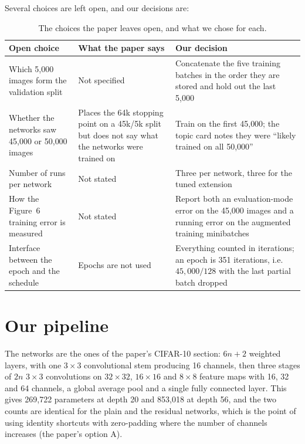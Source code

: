 \documentclass[11pt,a4paper]{article}
\begin{document}
Several choices are left open, and our decisions are:

\begin{table}[htbp]
\centering
\begin{tabular}{@{}p{3.6cm}p{5.2cm}p{6.4cm}@{}}
\toprule
\textbf{Open choice} & \textbf{What the paper says} & \textbf{Our decision} \\
\midrule
Which 5{,}000 images form the validation split & Not specified & Concatenate the five training batches in the order they are stored and hold out the last 5{,}000 \\
Whether the networks saw 45{,}000 or 50{,}000 images & Places the 64k stopping point on a 45k/5k split but does not say what the networks were trained on & Train on the first 45{,}000; the topic card notes they were ``likely trained on all 50{,}000'' \\
Number of runs per network & Not stated & Three per network, three for the tuned extension \\
How the Figure~6 training error is measured & Not stated & Report both an evaluation-mode error on the 45{,}000 images and a running error on the augmented training minibatches \\
Interface between the epoch and the schedule & Epochs are not used & Everything counted in iterations; an epoch is 351 iterations, i.e.\ $45{,}000/128$ with the last partial batch dropped \\
\bottomrule
\end{tabular}
\caption{The choices the paper leaves open, and what we chose for each.}
\label{tab:choices}
\end{table}

\section{Our pipeline}

The networks are the ones of the paper's CIFAR-10 section: $6n+2$ weighted
layers, with one $3\times3$ convolutional stem producing 16 channels, then three
stages of $2n$ $3\times3$ convolutions on $32\times32$, $16\times16$ and
$8\times8$ feature maps with 16, 32 and 64 channels, a global average pool and a
single fully connected layer. This gives 269{,}722 parameters at depth 20 and
853{,}018 at depth 56, and the two counts are identical for the plain and the
residual networks, which is the point of using identity shortcuts with
zero-padding where the number of channels increases (the paper's option A).
\end{document}
